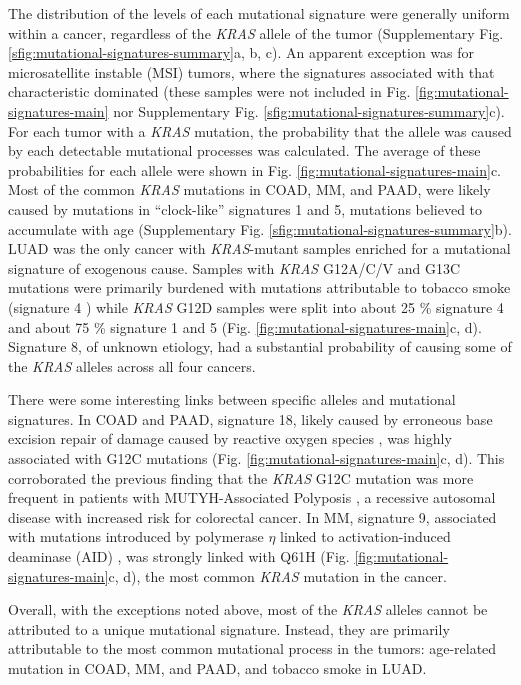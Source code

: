 \documentclass[english, 12pt, letterpaper]{article}
\newcommand{\KRAS}{\emph{KRAS}}
\begin{document}
The distribution of the levels of each mutational signature were generally uniform within a cancer, regardless of the \KRAS{} allele of the tumor (Supplementary Fig. \ref{sfig:mutational-signatures-summary}a, b, c). 
An apparent exception was for microsatellite instable (MSI) tumors, where the signatures associated with that characteristic dominated (these samples were not included in Fig. \ref{fig:mutational-signatures-main} nor Supplementary Fig. \ref{sfig:mutational-signatures-summary}c). 
For each tumor with a \KRAS{} mutation, the probability that the allele was caused by each detectable mutational processes was calculated. 
The average of these probabilities for each allele were shown in Fig. \ref{fig:mutational-signatures-main}c. 
Most of the common \KRAS{} mutations in COAD, MM, and PAAD, were likely caused by mutations in “clock-like” signatures 1 and 5, mutations believed to accumulate with age \cite{Alexandrov2015} (Supplementary Fig. \ref{sfig:mutational-signatures-summary}b). 
LUAD was the only cancer with \KRAS{}-mutant samples enriched for a mutational signature of exogenous cause. 
Samples with \KRAS{} G12A/C/V and G13C mutations were primarily burdened with mutations attributable to tobacco smoke (signature 4 \cite{Alexandrov2016}) while \KRAS{} G12D samples were split into about 25 \% signature 4 and about 75 \% signature 1 and 5 (Fig. \ref{fig:mutational-signatures-main}c, d).
Signature 8, of unknown etiology, had a substantial probability of causing some of the \KRAS{} alleles across all four cancers.

There were some interesting links between specific alleles and mutational signatures.
In COAD and PAAD, signature 18, likely caused by erroneous base excision repair of damage caused by reactive oxygen species \cite{Viel2017, Pilati2017}, was highly associated with G12C mutations (Fig. \ref{fig:mutational-signatures-main}c, d). 
This corroborated the previous finding that the \KRAS{} G12C mutation was more frequent in patients with MUTYH-Associated Polyposis \cite{Viel2017}, a recessive autosomal disease with increased risk for colorectal cancer. 
In MM, signature 9, associated with mutations introduced by polymerase $\eta$ linked to activation-induced deaminase (AID) \cite{Pavri2010Activation-inducedSpt5.}, was strongly linked with Q61H (Fig. \ref{fig:mutational-signatures-main}c, d), the most common \KRAS{} mutation in the cancer.

Overall, with the exceptions noted above, most of the \KRAS{} alleles cannot be attributed to a unique mutational signature. 
Instead, they are primarily attributable to the most common mutational process in the tumors: age-related mutation in COAD, MM, and PAAD, and tobacco smoke in LUAD.
\end{document}

